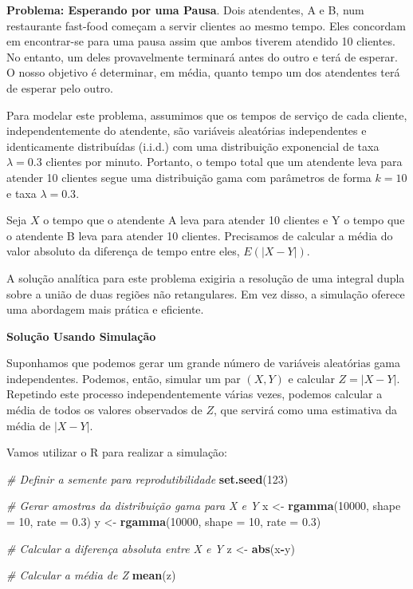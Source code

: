 \documentclass[
]{book}
\newenvironment{Shaded}{\begin{snugshade}}{\end{snugshade}}
\newcommand{\AttributeTok}[1]{\textcolor[rgb]{0.13,0.29,0.53}{#1}}
\newcommand{\CommentTok}[1]{\textcolor[rgb]{0.56,0.35,0.01}{\textit{#1}}}
\newcommand{\DecValTok}[1]{\textcolor[rgb]{0.00,0.00,0.81}{#1}}
\newcommand{\FloatTok}[1]{\textcolor[rgb]{0.00,0.00,0.81}{#1}}
\newcommand{\FunctionTok}[1]{\textcolor[rgb]{0.13,0.29,0.53}{\textbf{#1}}}
\newcommand{\NormalTok}[1]{#1}
\newcommand{\OtherTok}[1]{\textcolor[rgb]{0.56,0.35,0.01}{#1}}
\newcommand{\SpecialCharTok}[1]{\textcolor[rgb]{0.81,0.36,0.00}{\textbf{#1}}}
\begin{document}
\textbf{Problema: Esperando por uma Pausa}. Dois atendentes, A e B, num
restaurante fast-food começam a servir clientes ao mesmo tempo. Eles
concordam em encontrar-se para uma pausa assim que ambos tiverem
atendido 10 clientes. No entanto, um deles provavelmente terminará antes
do outro e terá de esperar. O nosso objetivo é determinar, em média,
quanto tempo um dos atendentes terá de esperar pelo outro.

Para modelar este problema, assumimos que os tempos de serviço de cada
cliente, independentemente do atendente, são variáveis aleatórias
independentes e identicamente distribuídas (i.i.d.) com uma distribuição
exponencial de taxa \(\lambda = 0.3\) clientes por minuto. Portanto, o
tempo total que um atendente leva para atender 10 clientes segue uma
distribuição gama com parâmetros de forma \(k = 10\) e taxa
\(\lambda = 0.3\).

Seja \(X\) o tempo que o atendente A leva para atender 10 clientes e Y o
tempo que o atendente B leva para atender 10 clientes. Precisamos de
calcular a média do valor absoluto da diferença de tempo entre eles,
\(E(|X - Y|)\).

A solução analítica para este problema exigiria a resolução de uma
integral dupla sobre a união de duas regiões não retangulares. Em vez
disso, a simulação oferece uma abordagem mais prática e eficiente.

\textbf{Solução Usando Simulação}

Suponhamos que podemos gerar um grande número de variáveis aleatórias
gama independentes. Podemos, então, simular um par \((X, Y)\) e calcular
\(Z = |X - Y|\). Repetindo este processo independentemente várias vezes,
podemos calcular a média de todos os valores observados de \(Z\), que
servirá como uma estimativa da média de \(|X - Y|\).

Vamos utilizar o R para realizar a simulação:

\begin{Shaded}
\begin{Highlighting}[]
\CommentTok{\# Definir a semente para reprodutibilidade}
\FunctionTok{set.seed}\NormalTok{(}\DecValTok{123}\NormalTok{)}

\CommentTok{\# Gerar amostras da distribuição gama para X e Y}
\NormalTok{x }\OtherTok{\textless{}{-}} \FunctionTok{rgamma}\NormalTok{(}\DecValTok{10000}\NormalTok{, }\AttributeTok{shape =} \DecValTok{10}\NormalTok{, }\AttributeTok{rate =} \FloatTok{0.3}\NormalTok{)}
\NormalTok{y }\OtherTok{\textless{}{-}} \FunctionTok{rgamma}\NormalTok{(}\DecValTok{10000}\NormalTok{, }\AttributeTok{shape =} \DecValTok{10}\NormalTok{, }\AttributeTok{rate =} \FloatTok{0.3}\NormalTok{)}

\CommentTok{\# Calcular a diferença absoluta entre X e Y}
\NormalTok{z }\OtherTok{\textless{}{-}} \FunctionTok{abs}\NormalTok{(x}\SpecialCharTok{{-}}\NormalTok{y)}

\CommentTok{\# Calcular a média de Z}
\FunctionTok{mean}\NormalTok{(z)}
\end{Highlighting}
\end{Shaded}
\end{document}
